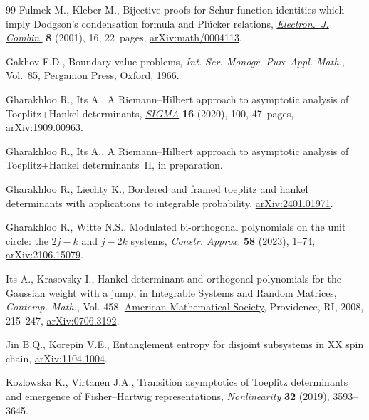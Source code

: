 \documentclass[pdftex]{sigma}
\numberwithin{equation}{section}
\begin{document}
\begin{thebibliography}{99}
Fulmek M., Kleber M., Bijective proofs for {S}chur function identities which
 imply {D}odgson's condensation formula and {P}l\"ucker relations,
 \href{https://doi.org/10.37236/1560}{\textit{Electron.~J. Combin.}} \textbf{8} (2001), 16, 22~pages,
 \href{https://arxiv.org/abs/math/0004113}{arXiv:math/0004113}.

Gakhov F.D., Boundary value problems, \textit{Int. Ser. Monogr. Pure Appl.
 Math.}, Vol.~85, \href{https://doi.org/10.1002/zamm.19670470318}{Pergamon Press}, Oxford, 1966.

Gharakhloo R., Its A., A {R}iemann--{H}ilbert approach to asymptotic analysis
 of {T}oeplitz+{H}ankel determinants, \href{https://doi.org/10.3842/SIGMA.2020.100}{\textit{SIGMA}} \textbf{16} (2020), 100,
 47~pages, \href{https://arxiv.org/abs/1909.00963}{arXiv:1909.00963}.

Gharakhloo R., Its A., A {R}iemann--{H}ilbert approach to asymptotic analysis
 of {T}oeplitz+{H}ankel determinants~{II}, in preparation.

Gharakhloo R., Liechty K., Bordered and framed toeplitz and hankel determinants
 with applications to integrable probability, \href{https://arxiv.org/abs/2401.01971}{arXiv:2401.01971}.

Gharakhloo R., Witte N.S., Modulated bi-orthogonal polynomials on the unit
 circle: the {$2j-k$} and {$j-2k$} systems, \href{https://doi.org/10.1007/s00365-022-09604-2}{\textit{Constr. Approx.}}
 \textbf{58} (2023), 1--74, \href{https://arxiv.org/abs/2106.15079}{arXiv:2106.15079}.

Its A., Krasovsky I., Hankel determinant and orthogonal polynomials for the
 {G}aussian weight with a jump, in Integrable {S}ystems and {R}andom
 {M}atrices, \textit{Contemp. Math.}, Vol. 458, \href{https://doi.org/10.1090/conm/458/08938}{American Mathematical Society}, Providence,
 RI, 2008, 215--247, \href{https://arxiv.org/abs/0706.3192}{arXiv:0706.3192}.

Jin B.Q., Korepin V.E., Entanglement entropy for disjoint subsystems in {XX}
 spin chain, \href{https://arxiv.org/abs/1104.1004}{arXiv:1104.1004}.

Kozlowska K., Virtanen J.A., Transition asymptotics of {T}oeplitz determinants
 and emergence of {F}isher--{H}artwig representations, \href{https://doi.org/10.1088/1361-6544/ab127a}{\textit{Nonlinearity}}
 \textbf{32} (2019), 3593--3645.


\end{thebibliography}
\end{document}
